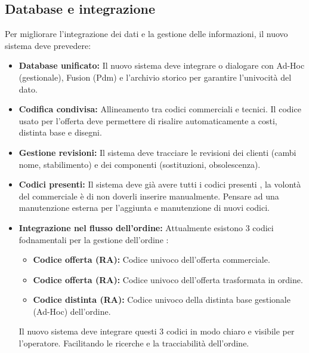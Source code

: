\documentclass[12pt, a4paper]{article} %
\begin{document}
\subsection{Database e integrazione}
Per migliorare l'integrazione dei dati e la gestione delle informazioni, il nuovo sistema deve prevedere:
\begin{itemize}
      \item \textbf{Database unificato:} Il nuovo sistema deve integrare o dialogare con Ad-Hoc (gestionale), Fusion (Pdm) e l'archivio storico per garantire l'univocità del dato.
      \item \textbf{Codifica condivisa:} Allineamento tra codici commerciali e tecnici. Il codice usato per l'offerta deve permettere di risalire automaticamente a costi, distinta base e disegni.
      \item \textbf{Gestione revisioni:} Il sistema deve tracciare le revisioni dei clienti (cambi nome, stabilimento) e dei componenti (sostituzioni, obsolescenza).
      \item \textbf{Codici presenti:} Il sistema deve già avere tutti i codici presenti , la volontà del commerciale è di non doverli inserire manualmente.
            Pensare ad una manutenzione esterna per l'aggiunta e manutenzione di nuovi codici.
      \item \textbf{Integrazione nel flusso dell'ordine:} Attualmente esistono 3 codici fodnamentali per la gestione dell'ordine :
            \begin{itemize}
                  \item \textbf{Codice offerta (RA):} Codice univoco dell'offerta commerciale.
                  \item \textbf{Codice offerta (RA):} Codice univoco dell'offerta trasformata in ordine.
                  \item \textbf{Codice distinta (RA):} Codice univoco della distinta base gestionale (Ad-Hoc) dell'ordine.
            \end{itemize}
            Il nuovo sistema deve integrare questi 3 codici in modo chiaro e visibile per l'operatore.
            Facilitando le ricerche e la tracciabilità dell'ordine.
\end{itemize}
\end{document}

